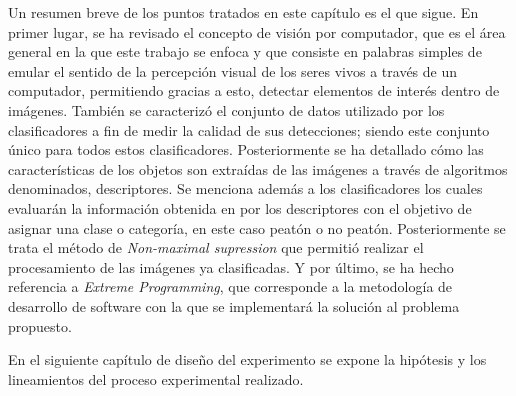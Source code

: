 Un resumen breve de los puntos tratados en este capítulo es el que sigue. En primer lugar, se ha revisado el concepto de visión por computador, que es el área general en la que este trabajo se enfoca y que consiste en palabras simples de emular el sentido de la percepción visual de los seres vivos a través de un computador, permitiendo gracias a esto, detectar elementos de interés dentro de imágenes. También se caracterizó el conjunto de datos utilizado por los clasificadores a fin de medir la calidad de sus detecciones; siendo este conjunto único para todos estos clasificadores. Posteriormente se ha detallado cómo las características de los objetos son extraídas de las imágenes a través de algoritmos denominados, descriptores. Se menciona además a los clasificadores los cuales evaluarán la información obtenida en por los descriptores con el objetivo de asignar una clase o categoría, en este caso peatón o no peatón. Posteriormente se trata el método de \textit{Non-maximal supression} que permitió realizar el procesamiento de las imágenes ya clasificadas. Y por último, se ha hecho referencia a \textit{Extreme Programming}, que corresponde a la metodología de desarrollo de software con la que se implementará la solución al problema propuesto.

En el siguiente capítulo de diseño del experimento se expone la hipótesis y los lineamientos del proceso experimental realizado. 




